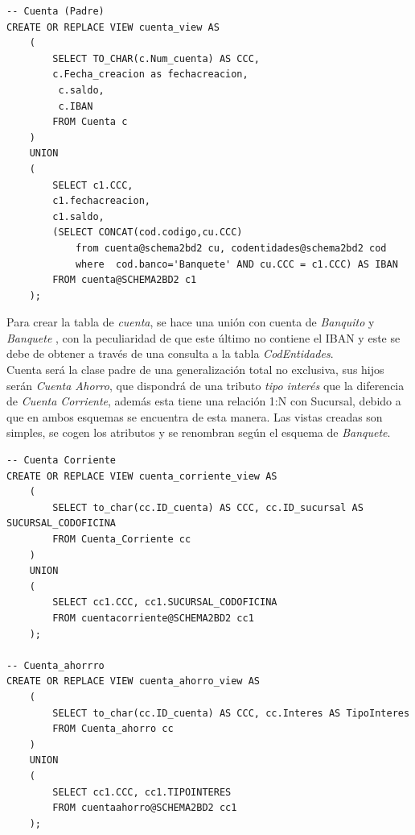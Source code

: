 \documentclass{article}
\begin{document}
\begin{lstlisting}
-- Cuenta (Padre)
CREATE OR REPLACE VIEW cuenta_view AS
    (
        SELECT TO_CHAR(c.Num_cuenta) AS CCC,
        c.Fecha_creacion as fechacreacion,
         c.saldo, 
         c.IBAN
        FROM Cuenta c
    )
    UNION
    (
        SELECT c1.CCC, 
        c1.fechacreacion, 
        c1.saldo, 
        (SELECT CONCAT(cod.codigo,cu.CCC) 
            from cuenta@schema2bd2 cu, codentidades@schema2bd2 cod
            where  cod.banco='Banquete' AND cu.CCC = c1.CCC) AS IBAN
        FROM cuenta@SCHEMA2BD2 c1
    );
\end{lstlisting}
Para crear la tabla de \textit{cuenta}, se hace una unión con cuenta de \emph{Banquito} y \emph{Banquete }, con la peculiaridad de que este último no contiene el IBAN y este se debe de obtener a través de una consulta a la tabla \textit{CodEntidades}.\\
Cuenta será la clase padre de una generalización total no exclusiva, sus hijos serán \textit{Cuenta Ahorro}, que dispondrá de una tributo \textit{tipo interés }que la diferencia de \textit{Cuenta Corriente}, además esta tiene una relación 1:N con Sucursal, debido a que en ambos esquemas se encuentra de esta manera. Las vistas creadas son simples, se cogen los atributos y se renombran según el esquema de \emph{Banquete}.
\begin{lstlisting}
-- Cuenta Corriente
CREATE OR REPLACE VIEW cuenta_corriente_view AS
    (
        SELECT to_char(cc.ID_cuenta) AS CCC, cc.ID_sucursal AS SUCURSAL_CODOFICINA
        FROM Cuenta_Corriente cc
    )
    UNION
    (
        SELECT cc1.CCC, cc1.SUCURSAL_CODOFICINA
        FROM cuentacorriente@SCHEMA2BD2 cc1
    );

-- Cuenta_ahorrro
CREATE OR REPLACE VIEW cuenta_ahorro_view AS
    (
        SELECT to_char(cc.ID_cuenta) AS CCC, cc.Interes AS TipoInteres
        FROM Cuenta_ahorro cc
    )
    UNION
    (
        SELECT cc1.CCC, cc1.TIPOINTERES
        FROM cuentaahorro@SCHEMA2BD2 cc1
    );
\end{lstlisting}
\end{document}
